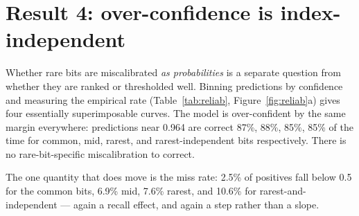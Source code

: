 \documentclass[11pt,a4paper]{article}
\begin{document}
\begin{table}[htbp]
\centering
\footnotesize
\caption{Sampled implied bits and the bit that guarantees them ($r$ = ECFP radius, $c$ = rankingset
count). The antecedent is typically the rarer, larger fragment that structurally contains the
consequent.}
\label{tab:impl}
\end{table}

\section{Result 4: over-confidence is index-independent}

Whether rare bits are miscalibrated \emph{as probabilities} is a separate question from whether
they are ranked or thresholded well. Binning predictions by confidence and measuring the empirical
rate (Table~\ref{tab:reliab}, Figure~\ref{fig:reliab}a) gives four essentially superimposable
curves. The model is over-confident by the same margin everywhere: predictions near 0.964 are
correct 87\%, 88\%, 85\%, 85\% of the time for common, mid, rarest, and rarest-independent bits
respectively. There is no rare-bit-specific miscalibration to correct.

The one quantity that does move is the miss rate: 2.5\% of positives fall below 0.5 for the common
bits, 6.9\% mid, 7.6\% rarest, and 10.6\% for rarest-and-independent --- again a recall effect, and
again a step rather than a slope.
\end{document}
